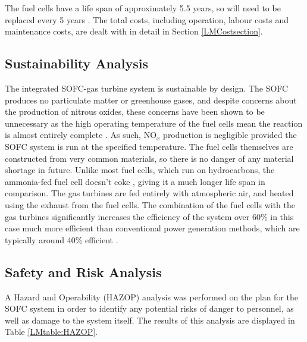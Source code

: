 \documentclass{article}
\begin{document}
The fuel cells have a life span of approximately 5.5 years, so will need to be replaced every 5 years \cite{LM24}. The total costs, including operation, labour costs and maintenance costs, are dealt with in detail in Section \ref{LMCostsection}.


\subsection{Sustainability Analysis}
The integrated SOFC-gas turbine system is sustainable by design. The SOFC produces no particulate matter or greenhouse gases, and despite concerns about the production of nitrous oxides, these concerns have been shown to be unnecessary as the high operating temperature of the fuel cells mean the reaction is almost entirely complete \cite{LM2}. As such, $\text{NO}_{x}$ production is negligible provided the SOFC system is run at the specified temperature. The fuel cells themselves are constructed from very common materials, so there is no danger of any material shortage in future. Unlike most fuel cells, which run on hydrocarbons, the ammonia-fed fuel cell doesn't coke \cite{LM10}, giving it a much longer life span in comparison. The gas turbines are fed entirely with atmospheric air, and heated using the exhaust from the fuel cells. The combination of the fuel cells with the gas turbines significantly increases the efficiency of the system \text{-} over 60\% in this case \text{-} much more efficient than conventional power generation methods, which are typically around 40\% efficient \cite{LM19}.


\subsection{Safety and Risk Analysis}
A Hazard and Operability (HAZOP) analysis was performed on the plan for the SOFC system in order to identify any potential risks of danger to personnel, as well as damage to the system itself. The results of this analysis are displayed in Table \ref{LMtable:HAZOP}. 



\end{document}

